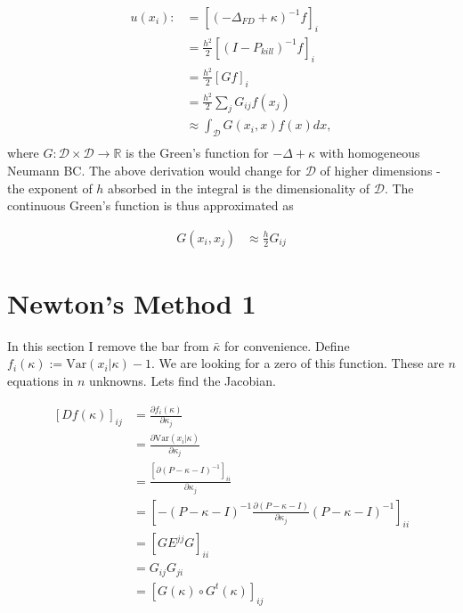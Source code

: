 \documentclass[paper=a4, fontsize=11pt]{scrartcl} %
\numberwithin{equation}{section} %
\numberwithin{figure}{section} %
\numberwithin{table}{section} %
\newcommand{\var}{\text{Var}}
\newcommand{\dom}{\mathcal{D}}
\begin{document}
\begin{align*}
  u(x_i) :&=[( -\Delta_{FD} + \kappa )^{-1}f]_i \\
  &=\frac{h^2}{2}[(I - P_{kill})^{-1}f]_i \\ 
  &=\frac{h^2}{2}[Gf]_i \\
  &=\frac{h^2}{2}\sum_{j}G_{ij}f(x_j) \\
  &\approx\int_{\dom}G(x_i,x)f(x)dx, \\
\end{align*}
where $G: \dom \times \dom \to \mathbb{R}$ is the Green's function for $-\Delta + \kappa$ with
homogeneous Neumann BC. The above derivation would
change for $\dom$ of higher dimensions - the 
exponent of $h$ absorbed in the integral is the dimensionality of $\dom$.
The continuous Green's function is thus approximated as

\begin{align}\label{G_cont}
  G(x_i,x_j) &\approx \frac{h}{2} G_{ij} 
\end{align}

\section{Newton's Method 1}
In this section I remove the bar from $\bar{\kappa}$
for convenience.
Define $f_{i}(\kappa) :=\var( x_i | \kappa) -1$. We 
are looking for a zero of this function. These are $n$ equations
in $n$ unknowns. Lets find the Jacobian.

\begin{align*}
  [Df(\kappa)]_{ij} &= \frac{ \partial f_{i}(\kappa)}{\partial \kappa_j} \\
  &= \frac{ \partial \var( x_i |\kappa)}{\partial \kappa_j} \\
  &= \frac{ [\partial (P - \kappa - I)^{-1}]_{ii}}{\partial \kappa_j} \\
  &= [-(P-\kappa - I)^{-1} \frac{ \partial (P - \kappa - I)}{\partial \kappa_j} (P- \kappa - I)^{-1}]_{ii} \\
  &= [G E^{jj}G]_{ii} \\
  &= G_{ij}G_{ji} \\
  &= [G(\kappa) \circ G^t(\kappa) ]_{ij}
\end{align*}
\end{document}
